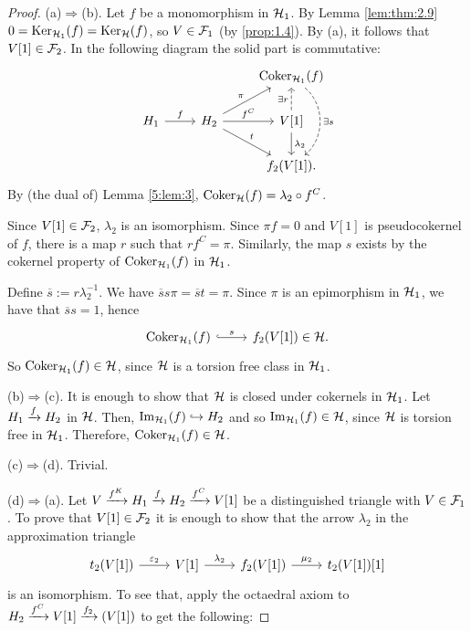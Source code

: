 \begin{proof}
  (a)$\Rightarrow$(b). Let $f$ be a monomorphism in $\mathcal{H}_1$. By Lemma \ref{lem:thm:2.9} $0=\operatorname{Ker}_{\mathcal{H}_1}(f)=\operatorname{Ker}_{\mathcal{H}}(f)$, so $V\in\mathcal{F}_1$ (by \ref{prop:1.4}). By (a), it follows that $V[1]\in\mathcal{F}_2$. In the following diagram the solid part is commutative:
  \begin{equation*}
    \begin{tikzcd}
      & & \Coker_{\clH_1}(f)\arrow[bend left=50,dashed]{dd}{\exists s}\\
      H_1\arrow{r}{f}
      & H_2\arrow{ur}{\pi}\arrow{r}{f^C}\arrow{dr}{t}
        & V[1]\arrow[dashed]{u}{\exists r}\arrow{d}{\lambda_2}\\
      & & f_2(V[1]).
    \end{tikzcd}
  \end{equation*}
  By (the dual of) Lemma \ref{5:lem:3}, $\operatorname{Coker}_{\mathcal{H}}(f)=\lambda_2\circ f^C$.

  Since $V[1]\in\mathcal{F}_2$, $\lambda_2$ is an isomorphism. Since $\pi f =0$ and $V[1]$ is pseudocokernel of $f$, there is a map $r$ such that $rf^C=\pi$. Similarly, the map $s$ exists by the cokernel property of $\operatorname{Coker}_{\mathcal{H}_1}(f)$ in $\mathcal{H}_1$.

  Define $\overline{s}:=r\lambda_2^{-1}$. We have $\overline{s}s\pi=\overline{s}t=\pi$. Since $\pi$ is an epimorphism in $\mathcal{H}_1$, we have that $\overline{s}s=1$, hence
  \begin{equation*}
    \begin{tikzcd}
      \Coker_{\clH_1}(f)\arrow[hook]{r}{s}
      & f_2(V[1])\in\clH.
    \end{tikzcd}
  \end{equation*}
  So $\operatorname{Coker}_{\mathcal{H}_1}(f)\in\mathcal{H}$, since $\mathcal{H}$ is a torsion free class in $\mathcal{H}_1$.

  \smallskip\noindent
  (b)$\Rightarrow$(c). It is enough to show that $\mathcal{H}$ is closed under cokernels in $\mathcal{H}_1$. Let $H_1\xrightarrow{f}H_2$ in $\mathcal{H}$. Then, $\operatorname{Im}_{\mathcal{H}_1}(f)\hookrightarrow H_2$ and so $\operatorname{Im}_{\mathcal{H}_1}(f)\in\mathcal{H}$, since $\mathcal{H}$ is torsion free in $\mathcal{H}_1$. Therefore, $\operatorname{Coker}_{\mathcal{H}_1}(f)\in\mathcal{H}$.

  \smallskip\noindent
  (c)$\Rightarrow$(d). Trivial.

  \smallskip\noindent
  (d)$\Rightarrow$(a). Let $V\xrightarrow{f^K}H_1\xrightarrow{f}H_2\xrightarrow{f^C}V[1]$ be a distinguished triangle with $V\in\mathcal{F}_1$. To prove that $V[1]\in\mathcal{F}_2$ it is enough to show that the arrow $\lambda_2$ in the approximation triangle
  \begin{equation*}
    \begin{tikzcd}
      t_2(V[1])\arrow{r}{\varepsilon_2}
      & V[1]\arrow{r}{\lambda_2}
        & f_2(V[1])\arrow{r}{\mu_2}
          & t_2(V[1])[1]
    \end{tikzcd}
  \end{equation*}
  is an isomorphism. To see that, apply the octaedral axiom to $H_2\xrightarrow{f^C}V[1]\xrightarrow{f_2}(V[1])$ to get the following:


\end{proof}

